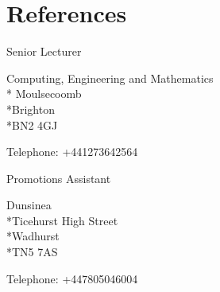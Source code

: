 \documentclass[a4paper, 12pt]{cv_class}
\begin{document}
\section{References}
\begin{itemize}
{\small
	\item Senior Lecturer
	\item Computing, Engineering and Mathematics\\* Moulsecoomb\\*Brighton\\*BN2 4GJ
\item Telephone: +441273642564
	}
\end{itemize}
\begin{itemize}
{\small
	\item Promotions Assistant
	\item Dunsinea\\*Ticehurst High Street\\*Wadhurst \\*TN5 7AS
	\item Telephone: +447805046004
	
}
\end{itemize}

\end{document}
